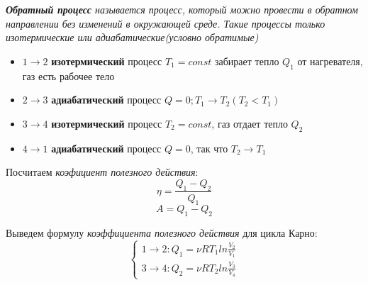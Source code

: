 \begin{center}
\end{center}
 \textit{\textbf{Обратный процесс} называется процесс, который можно провести в обратном направлении без изменений в окружающей среде. Такие процессы только изотермические или адиабатические(условно обратимые)}
\begin{itemize}
    \item $1 \to 2$ \textbf{изотермический} процесс $T_1 = const$ забирает тепло $Q_1$ от нагревателя, газ есть рабочее тело
    \item $2 \to 3$ \textbf{адиабатический} процесс $ Q = 0 ; T_1 \to T_2(T_2 < T_1)$
    \item $3 \to 4$ \textbf{изотермический} процесс $T_2 = const$, газ отдает тепло $Q_2$
    \item $4 \to 1$ \textbf{адиабатический} процесс $Q = 0$, так что $T_2 \to T_1$
\end{itemize}
Посчитаем \textit{коэфициент полезного действия}:
\[ \eta = \frac{Q_1 - Q_2}{Q_1}\]
\[A = Q_1 - Q_2 \]

Выведем формулу \textit{коэффициента полезного действия} для цикла Карно:
\begin{equation*}
    \begin{cases}
        1 \to 2: Q_1 = \nu RT_1 ln{\frac{V_2}{V_1}}
        \\
        3 \to 4: Q_2 = \nu RT_2 ln{\frac{V_3}{V_4}}
    \end{cases}
\end{equation*}

